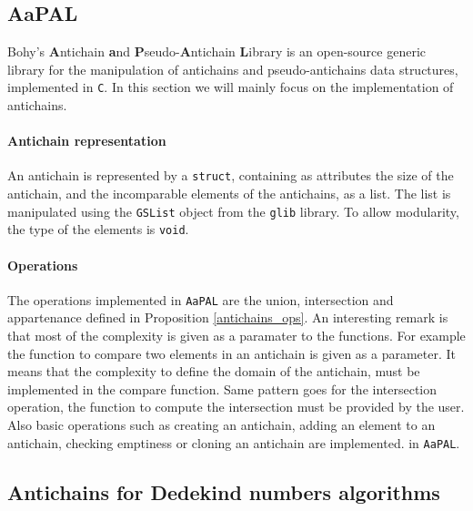 \documentclass[letterpaper]{article}
\theoremstyle{definition}
\begin{document}
\subsection{AaPAL}


Bohy's \textbf{A}ntichain
\textbf{a}nd \textbf{P}seudo-\textbf{A}ntichain \textbf{L}ibrary \cite{aapal}
is an open-source generic library for the manipulation
of antichains and pseudo-antichains data structures,
implemented in \texttt{C}. In this section we will mainly focus
on the implementation of antichains.


\paragraph{Antichain representation}

An antichain is represented by a \texttt{struct}, containing as attributes
the size of the antichain, and the incomparable elements of the antichains,
as a list. The list is manipulated using the \texttt{GSList} object
from the \texttt{glib} library.
To allow modularity, the type of the elements
is \texttt{void}.

\paragraph{Operations}

The operations implemented in \texttt{AaPAL}
are the union, intersection and appartenance
defined in Proposition \ref{antichains_ops}.
An interesting remark is that most of the complexity is given as a paramater
to the functions. For example the function to compare two elements in
an antichain is given as a parameter. It means that the complexity to define
the domain of the antichain, must be implemented in the compare function.
Same pattern goes for the intersection operation,
the function to compute the intersection must be provided by the user.
Also basic
operations such as creating an antichain,
adding an element to
an antichain, checking emptiness or cloning an antichain are implemented.
in \texttt{AaPAL}.

\subsection{Antichains for Dedekind numbers algorithms}
\end{document}
